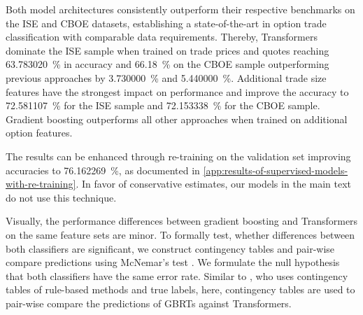 Both model architectures consistently outperform their respective benchmarks on the \gls{ISE} and \gls{CBOE} datasets, establishing a state-of-the-art in option trade classification with comparable data requirements. Thereby, Transformers dominate the \gls{ISE} sample when trained on trade prices and quotes reaching \SI{63.783020}{\percent}  in accuracy and \SI{66.18}{\percent} on the \gls{CBOE} sample outperforming previous approaches by \SI{3.730000}{\percent} and \SI{5.440000}{\percent}. Additional trade size features have the strongest impact on performance and improve the accuracy to \SI{72.581107}{\percent} for the \gls{ISE} sample and \SI{72.153338}{\percent} for the \gls{CBOE} sample. Gradient boosting outperforms all other approaches when trained on additional option features.

The results can be enhanced through re-training on the validation set improving accuracies to \SI{76.162269}{\percent}, as documented in \cref{app:results-of-supervised-models-with-re-training}. In favor of conservative estimates, our models in the main text do not use this technique.

Visually, the performance differences between gradient boosting and Transformers on the same feature sets are minor. To formally test, whether differences between both classifiers are significant, we construct contingency tables and pair-wise compare predictions using McNemar's test \autocite[][153--157]{mcnemarNoteSamplingError1947}. We formulate the null hypothesis that both classifiers have the same error rate.
Similar to \textcite[][267]{odders-whiteOccurrenceConsequencesInaccurate2000}, who uses contingency tables of rule-based methods and true labels, here, contingency tables are used to pair-wise compare the predictions of \glspl{GBRT} against Transformers.

